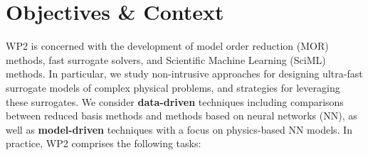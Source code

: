 

\section{Objectives \& Context}



WP2 is concerned  with the development of model  order reduction (MOR)
methods,  fast  surrogate  solvers, and  Scientific  Machine  Learning
(SciML) methods. In particular,  we study non-intrusive approaches for
designing ultra-fast  surrogate models  of complex  physical problems,
and  strategies  for leveraging  these  surrogates.  We consider  {\bf
  data-driven} techniques including  comparisons between reduced basis
methods and  methods based on  neural networks  (NN), as well  as {\bf
  model-driven} techniques  with a  focus on physics-based  NN models.
In practice, WP2 comprises the following tasks:

